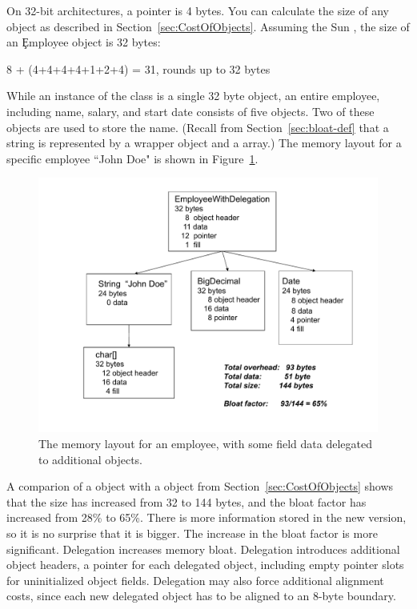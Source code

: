 On 32-bit architectures, a pointer is 4 bytes. 
You can calculate the size of any object as described in
Section~\ref{sec:CostOfObjects}.
Assuming the Sun \jre, the size of an \c{Employee} object is 32 bytes:
\begin{shortlisting}
8 + (4+4+4+4+1+2+4) = 31, rounds up to 32 bytes
\end{shortlisting}

While an instance of the  class is a single 32
byte object, an entire employee, including name, salary, and start date
consists of five objects. Two of these objects are used to store the name.
(Recall from Section~\ref{sec:bloat-def} that a string is represented by a
wrapper  object and a  array.) The memory layout for
a specific employee ``John Doe" is shown in Figure~\ref{fig:employee-status}.
 \begin{figure}
  \centering
 \includegraphics[width=.80\textwidth]{part1/Figures/modelingdatatypes/employee-status.pdf}
  \caption{The memory layout for an employee, with some field data
  delegated to additional objects.}
  \label{fig:employee-status}
\end{figure}

A comparion of a  object with a
 object from Section~\ref{sec:CostOfObjects} shows that
the size has increased from 32 to 144 bytes, and the bloat factor has increased
from 28\% to 65\%.
There is more information stored in the new version, so it is no surprise that it is bigger. The increase
in the bloat factor is more significant. Delegation increases memory bloat. Delegation introduces additional
object headers, a pointer for each delegated object, including empty
pointer slots for uninitialized object fields. Delegation may also force additional alignment costs, since
each new delegated object has to be aligned to an 8-byte boundary.

